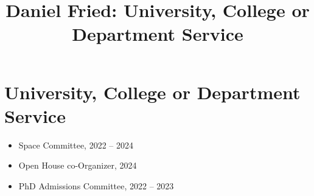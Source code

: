 \documentclass[11pt]{article}
\title{\vspace{-4em}Daniel Fried: University, College or Department Service\vspace{-0.5em}}
\date{}
\begin{document}
\maketitle

\section*{University, College or Department Service}
\begin{itemize}
    \item Space Committee, 2022 -- 2024
    \item Open House co-Organizer, 2024
		\item PhD Admissions Committee, 2022 -- 2023
\end{itemize}
\end{document}
